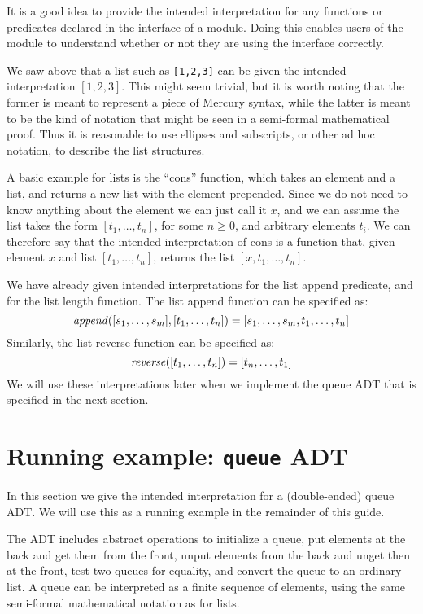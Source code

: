 It is a good idea to
provide the intended interpretation
for any functions or predicates
declared in the interface of a module.
Doing this enables users of the module
to understand whether or not they are
using the interface correctly.

We saw above that a list such as \texttt{[1,2,3]}
can be given the intended interpretation $[1, 2, 3]$.
This might seem trivial,
but it is worth noting that
the former is meant to represent a piece of Mercury syntax,
while the latter is meant to be the kind of notation
that might be seen in a semi-formal mathematical proof.
Thus it is reasonable to use ellipses and subscripts,
or other ad hoc notation,
to describe the list structures.

A basic example for lists is the ``cons'' function,
which takes an element and a list,
and returns a new list with the element prepended.
Since we do not need to know anything about the element
we can just call it $x$,
and we can assume the list takes the form $[t_1, \ldots, t_n]$,
for some $n \geqslant 0$, and arbitrary elements $t_i$.
We can therefore say that
the intended interpretation of cons is a function that,
given element $x$ and list $[t_1, \ldots, t_n]$,
returns the list $[x, t_1, \ldots, t_n]$.

We have already given intended interpretations
for the list append predicate,
and for the list length function.
The list append function can be specified as:
\[
    \text{\textit{append}}([s_1, \ldots, s_m], [t_1, \ldots, t_n]) =
        [s_1, \ldots, s_m, t_1, \ldots, t_n]
\]
Similarly, the list reverse function can be specified as:
\[
    \text{\textit{reverse}}([t_1, \ldots, t_n]) = [t_n, \ldots, t_1]
\]
We will use these interpretations later
when we implement the queue ADT
that is specified in the next section.


\section{Running example: \texttt{queue} ADT}
\label{sec:queue-spec}

In this section we give the intended interpretation for
a (double-ended) queue ADT.
We will use this as a running example
in the remainder of this guide.

The ADT includes abstract operations to initialize a queue,
put elements at the back and get them from the front,
unput elements from the back and unget then at the front,
test two queues for equality,
and convert the queue to an ordinary list.
A queue can be interpreted as a finite sequence of elements,
using the same semi-formal mathematical notation as for lists.

